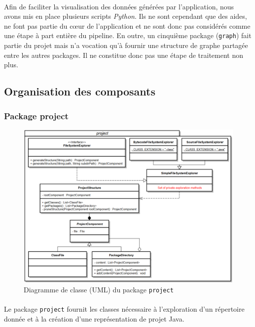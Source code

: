 \documentclass{scrartcl}
\begin{document}
    \paragraph{}Afin de faciliter la visualisation des données générées par l'application, nous avons mis en place plusieurs scripts \textit{Python}. Ils ne sont cependant que des aides, ne font pas partie du cœur de l'application et ne sont donc pas considérés comme une étape à part entière du pipeline. En outre, un cinquième package (\texttt{graph}) fait partie du projet mais n'a vocation qu'à fournir une structure de graphe partagée entre les autres packages. Il ne constitue donc pas une étape de traitement non plus.

\subsection{Organisation des composants}

\subsubsection{Package project}
    \begin{figure}[h!]
        \centering
        \includegraphics[width=\textwidth]{img/uml/project.png}
        \caption{Diagramme de classe (UML) du package \texttt{project}}
    \end{figure}
	\paragraph{}Le package \texttt{project} fournit les classes nécessaire à l'exploration d'un répertoire donnée et à la création d'une représentation de projet Java.
\end{document}
